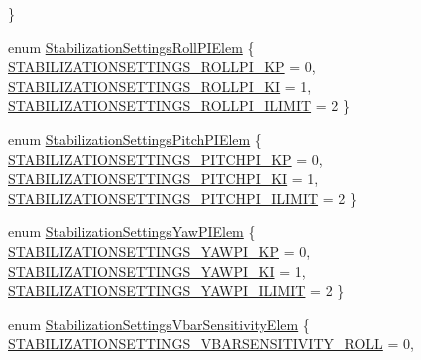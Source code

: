 \begin{DoxyCompactItemize}
 \}
\item 
enum \hyperlink{group___stabilization_settings_gafd9445e71d966c73e30cd7990f36cf21}{\-Stabilization\-Settings\-Roll\-P\-I\-Elem} \{ \hyperlink{group___stabilization_settings_ggafd9445e71d966c73e30cd7990f36cf21a9c5d36fafaaa3bdf401dae2c4e8b30cf}{\-S\-T\-A\-B\-I\-L\-I\-Z\-A\-T\-I\-O\-N\-S\-E\-T\-T\-I\-N\-G\-S\-\_\-\-R\-O\-L\-L\-P\-I\-\_\-\-K\-P} = 0, 
\hyperlink{group___stabilization_settings_ggafd9445e71d966c73e30cd7990f36cf21aab03ab05db3c09792a21a73ac9c1e6c2}{\-S\-T\-A\-B\-I\-L\-I\-Z\-A\-T\-I\-O\-N\-S\-E\-T\-T\-I\-N\-G\-S\-\_\-\-R\-O\-L\-L\-P\-I\-\_\-\-K\-I} = 1, 
\hyperlink{group___stabilization_settings_ggafd9445e71d966c73e30cd7990f36cf21a99bc6a4059882ce699d8ef25a7e3f4cc}{\-S\-T\-A\-B\-I\-L\-I\-Z\-A\-T\-I\-O\-N\-S\-E\-T\-T\-I\-N\-G\-S\-\_\-\-R\-O\-L\-L\-P\-I\-\_\-\-I\-L\-I\-M\-I\-T} = 2
 \}
\item 
enum \hyperlink{group___stabilization_settings_ga66c287e4cb62b33d994ab8ce5895c40b}{\-Stabilization\-Settings\-Pitch\-P\-I\-Elem} \{ \hyperlink{group___stabilization_settings_gga66c287e4cb62b33d994ab8ce5895c40ba2d38ffcd100608fbc930f47709f8e3cb}{\-S\-T\-A\-B\-I\-L\-I\-Z\-A\-T\-I\-O\-N\-S\-E\-T\-T\-I\-N\-G\-S\-\_\-\-P\-I\-T\-C\-H\-P\-I\-\_\-\-K\-P} = 0, 
\hyperlink{group___stabilization_settings_gga66c287e4cb62b33d994ab8ce5895c40ba59cf14b8c203e79b2b6021f2b7f2d9d3}{\-S\-T\-A\-B\-I\-L\-I\-Z\-A\-T\-I\-O\-N\-S\-E\-T\-T\-I\-N\-G\-S\-\_\-\-P\-I\-T\-C\-H\-P\-I\-\_\-\-K\-I} = 1, 
\hyperlink{group___stabilization_settings_gga66c287e4cb62b33d994ab8ce5895c40bacc38eb042560a28f62e57ebce8f026b0}{\-S\-T\-A\-B\-I\-L\-I\-Z\-A\-T\-I\-O\-N\-S\-E\-T\-T\-I\-N\-G\-S\-\_\-\-P\-I\-T\-C\-H\-P\-I\-\_\-\-I\-L\-I\-M\-I\-T} = 2
 \}
\item 
enum \hyperlink{group___stabilization_settings_ga3952b929991c01688958691a24b9cdfd}{\-Stabilization\-Settings\-Yaw\-P\-I\-Elem} \{ \hyperlink{group___stabilization_settings_gga3952b929991c01688958691a24b9cdfda3b61144e2cf77534589d4796036b2ea6}{\-S\-T\-A\-B\-I\-L\-I\-Z\-A\-T\-I\-O\-N\-S\-E\-T\-T\-I\-N\-G\-S\-\_\-\-Y\-A\-W\-P\-I\-\_\-\-K\-P} = 0, 
\hyperlink{group___stabilization_settings_gga3952b929991c01688958691a24b9cdfdafa132b1f930debdb3317c38f2e71992b}{\-S\-T\-A\-B\-I\-L\-I\-Z\-A\-T\-I\-O\-N\-S\-E\-T\-T\-I\-N\-G\-S\-\_\-\-Y\-A\-W\-P\-I\-\_\-\-K\-I} = 1, 
\hyperlink{group___stabilization_settings_gga3952b929991c01688958691a24b9cdfdafc903b6a017182d8cb372fd9f6b5f42f}{\-S\-T\-A\-B\-I\-L\-I\-Z\-A\-T\-I\-O\-N\-S\-E\-T\-T\-I\-N\-G\-S\-\_\-\-Y\-A\-W\-P\-I\-\_\-\-I\-L\-I\-M\-I\-T} = 2
 \}
\item 
enum \hyperlink{group___stabilization_settings_ga38bfb5af7bf0141429d314e7fbf46b80}{\-Stabilization\-Settings\-Vbar\-Sensitivity\-Elem} \{ \hyperlink{group___stabilization_settings_gga38bfb5af7bf0141429d314e7fbf46b80ae00bf34af2a1580422522832861f8c48}{\-S\-T\-A\-B\-I\-L\-I\-Z\-A\-T\-I\-O\-N\-S\-E\-T\-T\-I\-N\-G\-S\-\_\-\-V\-B\-A\-R\-S\-E\-N\-S\-I\-T\-I\-V\-I\-T\-Y\-\_\-\-R\-O\-L\-L} = 0, 

\end{DoxyCompactItemize}
